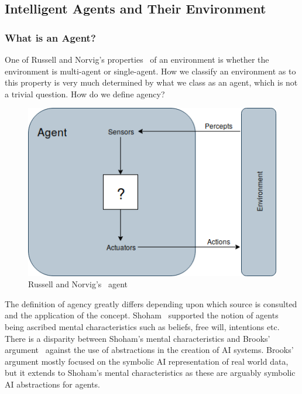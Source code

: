 \documentclass[]{final_report}
\begin{document}
\subsection{Intelligent Agents and Their Environment}
\subsubsection{What is an Agent?}
One of Russell and Norvig's properties~\cite{russell2016artificial} of an environment is whether the environment is multi-agent or single-agent. How we classify an environment as to this property is very much determined by what we class as an agent, which is not a trivial question. How do we define agency?\par 
\begin{figure}
\vspace{-20pt}
\begin{framed}
	\center
	\includegraphics[width=\textwidth]{russellnorvigagent.png}
	\caption{Russell and Norvig's~\cite{russell2016artificial} agent}
	\label{fig:rnagent}
\end{framed}
\vspace{-20pt}
\end{figure}
The definition of agency greatly differs depending upon which source is consulted and the application of the concept. Shoham~\cite{shoham1993agent} supported the notion of agents being ascribed mental characteristics such as beliefs, free will, intentions etc. There is a disparity between Shoham's mental characteristics and Brooks' argument~\cite{brooks1991intelligence} against the use of abstractions in the creation of AI systems. Brooks' argument mostly focused on the symbolic AI representation of real world data, but it extends to Shoham's mental characteristics as these are arguably symbolic AI abstractions for agents.\par 
\end{document}
